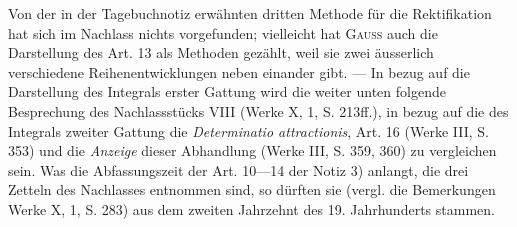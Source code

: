 Von der in der Tagebuchnotiz erwähnten dritten Methode für die Rektifikation
hat sich im Nachlass nichts vorgefunden; vielleicht hat \textsc{Gauss} auch
die Darstellung des Art. 13 als  Methoden gezählt, weil sie zwei äusserlich
verschiedene Reihenentwicklungen neben einander gibt. — In bezug auf
die Darstellung des Integrals erster Gattung wird die weiter unten folgende
Besprechung des Nachlassstücks VIII (Werke X, 1, S. 213ff.), in bezug auf
die des Integrals zweiter Gattung die \textit{Determinatio attractionis}, Art. 16 (Werke
III, S. 353) und die \textit{Anzeige} dieser Abhandlung (Werke III, S. 359, 360) zu
vergleichen sein. Was die Abfassungszeit der Art. 10—14 der Notiz 3) anlangt,
die drei Zetteln des Nachlasses entnommen sind, so dürften sie (vergl.
die Bemerkungen Werke X, 1, S. 283) aus dem zweiten Jahrzehnt des 19.
Jahrhunderts stammen.

